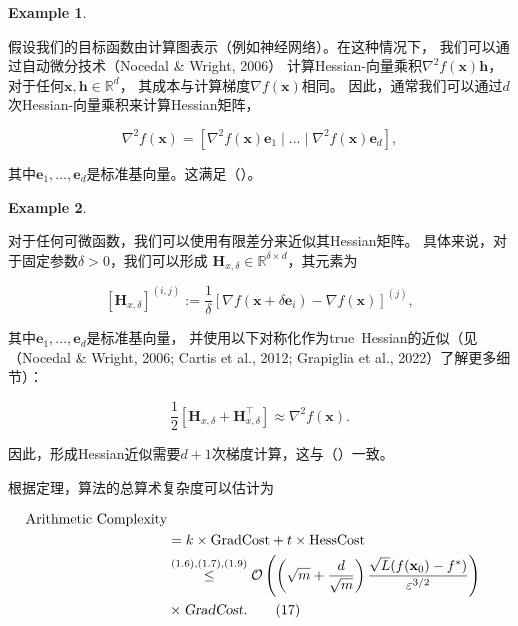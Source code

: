 \documentclass[a4paper,twoside,AutoFakeBold]{article}
\theoremstyle{definition}
\newtheorem{exmp2}{{Example}}[section]
\begin{document}
\begin{exmp2}\label{exam:3.3}

假设我们的目标函数由计算图表示（例如神经网络）。在这种情况下，
我们可以通过自动微分技术（Nocedal \& Wright, 2006）
计算Hessian-向量乘积\(\nabla^2 f(\mathbf{x}) \mathbf{h}\)，
对于任何\(\mathbf{x}, \mathbf{h} \in \mathbb{R}^d\)，
其成本与计算梯度\(\nabla f(\mathbf{x})\)相同。
因此，通常我们可以通过\(d\)次Hessian-向量乘积来计算Hessian矩阵，

\[
\nabla^2 f(\mathbf{x}) = \left[ \nabla^2 f(\mathbf{x}) \mathbf{e}_1 \mid \ldots \mid \nabla^2 f(\mathbf{x}) \mathbf{e}_d \right],
\]

其中\(\mathbf{e}_1, \ldots, \mathbf{e}_d\)是标准基向量。这满足（）。

\end{exmp2}	

\begin{exmp2}\label{exam:3.4}

对于任何可微函数，我们可以使用有限差分来近似其Hessian矩阵。
具体来说，对于固定参数\(\delta > 0\)，我们可以形成
\(\mathbf{H}_{x,\delta} \in \mathbb{R}^{\delta \times d}\)，其元素为

\[
\left[ \mathbf{H}_{x,\delta} \right]^{(i,j)} := \frac{1}{\delta} \left[ \nabla f(\mathbf{x} + \delta \mathbf{e}_i) - \nabla f(\mathbf{x}) \right]^{(j)},
\]

其中\(\mathbf{e}_1, \ldots, \mathbf{e}_d\)是标准基向量，
并使用以下对称化作为true\ Hessian的近似（见（Nocedal \& Wright, 2006; Cartis et al., 2012; Grapiglia et al., 2022）了解更多细节）：

\[
\frac{1}{2} \left[ \mathbf{H}_{x,\delta} + \mathbf{H}_{x,\delta}^\top \right] \approx \nabla^2 f(\mathbf{x}).
\]

因此，形成Hessian近似需要\(d + 1\)次梯度计算，这与（）一致。

\end{exmp2}
根据定理，算法的总算术复杂度可以估计为

\begin{align}\label{17}
\text{Arithmetic Complexity} \\
&= k \times \text{GradCost} + t \times \text{HessCost} \\
&\stackrel{(1.6),(1.7),(1.9)}{\leq} \mathcal{O}\left( \left( \sqrt{m} + \frac{d}{\sqrt{m}} \right) \frac{\sqrt{L}(f(\mathbf{x}_0) - f^*)}{\varepsilon^{3/2}} \right)\\ 
&\times \textsl{GradCost}. \tag{17}
\end{align}
\end{document}
